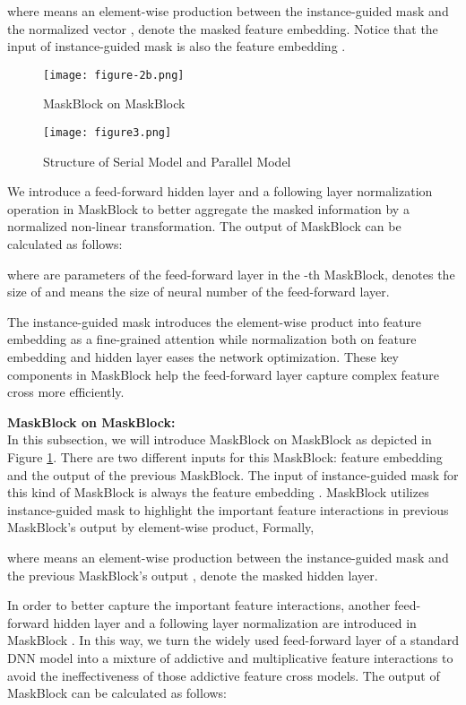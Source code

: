 \documentclass[sigconf]{acmart}
\begin{document}
 where  means an element-wise production between the instance-guided mask and the normalized vector ,  denote the masked feature embedding. Notice that the input of instance-guided mask  is also the feature embedding .


 \begin{figure}
   \setlength{\abovecaptionskip}{1pt}
   \texttt{[image: figure-2b.png]}
   \caption{MaskBlock on MaskBlock }
   \label{Fig.figure-2b}

 \end{figure}


 \begin{figure*}
   \setlength{\abovecaptionskip}{1pt}
   \texttt{[image: figure3.png]}
   \caption{Structure of Serial Model and Parallel Model}
   \label{Fig.Structure}
 \end{figure*}

We introduce  a feed-forward hidden layer and a following layer normalization operation in MaskBlock to better aggregate the masked information by a normalized non-linear transformation. The output of MaskBlock can be calculated as follows:

where  are parameters of the feed-forward layer in the -th MaskBlock,  denotes the size of  and  means the size of neural number of the feed-forward layer.


 The instance-guided mask introduces the element-wise product  into feature embedding  as a fine-grained  attention while normalization both on feature embedding and hidden layer eases the network optimization. These key components  in MaskBlock help the feed-forward layer capture complex feature cross more efficiently.


\noindent\textbf{MaskBlock on MaskBlock:}\\
In this subsection, we will introduce MaskBlock on MaskBlock as depicted in Figure \ref{Fig.figure-2b}. There are two different inputs for this MaskBlock: feature embedding  and the output  of the previous MaskBlock. The input of instance-guided mask for this kind of MaskBlock is always the feature embedding . MaskBlock utilizes instance-guided mask to highlight the important feature interactions in previous MaskBlock's output  by element-wise product, Formally,

 where  means an element-wise production between the instance-guided mask   and the previous MaskBlock's output ,  denote the masked hidden layer.


In order to better capture the important feature interactions, another feed-forward hidden layer and a following layer normalization are introduced in MaskBlock . In this way, we turn the widely used feed-forward layer of a standard DNN model into a mixture of addictive and multiplicative feature interactions to avoid the ineffectiveness of those addictive feature cross models.  The output of MaskBlock can be calculated as follows:
\end{document}
